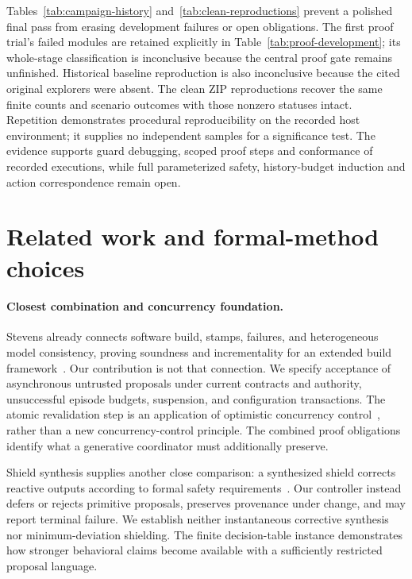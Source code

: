 \documentclass[pdflatex,sn-mathphys-num]{sn-jnl}
\theoremstyle{thmstyleone}
\theoremstyle{thmstylethree}
\theoremstyle{thmstyletwo}
\begin{document}
Tables~\ref{tab:campaign-history} and~\ref{tab:clean-reproductions} prevent a polished final pass from erasing development failures or open obligations. The first proof trial's failed modules are retained explicitly in Table~\ref{tab:proof-development}; its whole-stage classification is inconclusive because the central proof gate remains unfinished. Historical baseline reproduction is also inconclusive because the cited original explorers were absent. The clean ZIP reproductions recover the same finite counts and scenario outcomes with those nonzero statuses intact. Repetition demonstrates procedural reproducibility on the recorded host environment; it supplies no independent samples for a significance test. The evidence supports guard debugging, scoped proof steps and conformance of recorded executions, while full parameterized safety, history-budget induction and action correspondence remain open.

\FloatBarrier

\section{Related work and formal-method choices}\label{sec:related}
\paragraph{Closest combination and concurrency foundation.} Stevens already connects software build, stamps, failures, and heterogeneous model consistency, proving soundness and incrementality for an extended build framework~\cite{megamodelbuild}. Our contribution is not that connection. We specify acceptance of asynchronous untrusted proposals under current contracts and authority, unsuccessful episode budgets, suspension, and configuration transactions. The atomic revalidation step is an application of optimistic concurrency control~\cite{occ}, rather than a new concurrency-control principle. The combined proof obligations identify what a generative coordinator must additionally preserve.

Shield synthesis supplies another close comparison: a synthesized shield corrects reactive outputs according to formal safety requirements~\cite{shield}. Our controller instead defers or rejects primitive proposals, preserves provenance under change, and may report terminal failure. We establish neither instantaneous corrective synthesis nor minimum-deviation shielding. The finite decision-table instance demonstrates how stronger behavioral claims become available with a sufficiently restricted proposal language.
\end{document}
